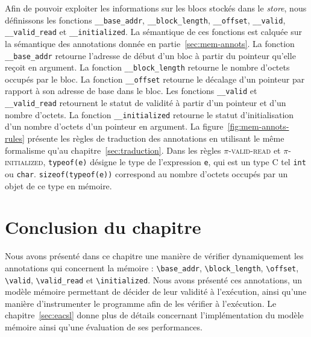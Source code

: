 Afin de pouvoir exploiter les informations sur les blocs stockés dans le
\textit{store}, nous définissons les fonctions \lstinline'__base_addr',
\lstinline'__block_length', \lstinline'__offset', \lstinline'__valid',
\lstinline'__valid_read' et \lstinline'__initialized'.
La sémantique de ces fonctions est calquée sur la sémantique des annotations
\eacsl donnée en partie~\ref{sec:mem-annots}.
La fonction \lstinline'__base_addr' retourne l'adresse de début d'un bloc à
partir du pointeur qu'elle reçoit en argument.
La fonction \lstinline'__block_length' retourne le nombre d'octets occupés par
le bloc.
La fonction \lstinline'__offset' retourne le décalage d'un pointeur par rapport
à son adresse de base dans le bloc.
Les fonctions \lstinline'__valid' et \lstinline'__valid_read'
retournent le statut de validité à partir d'un pointeur et d'un nombre d'octets.
La fonction \lstinline'__initialized' retourne le statut d'initialisation
d'un nombre d'octets d'un pointeur en argument.
La figure~\ref{fig:mem-annots-rules} présente les règles de traduction des
annotations en utilisant le même formalisme qu'au chapitre~\ref{sec:traduction}.
Dans les règles \textsc{$\pi$-valid-read} et \textsc{$\pi$-initialized},
\lstinline'typeof(e)' désigne le type de l'expression \lstinline'e', qui est un
type C tel \lstinline'int' ou \lstinline'char'.
\lstinline'sizeof(typeof(e))' correspond au nombre d'octets occupés par un objet
de ce type en mémoire.


\section*{Conclusion du chapitre}


Nous avons présenté dans ce chapitre une manière de vérifier dynamiquement les
annotations \eacsl qui concernent la mémoire : \lstinline'\base_addr',
\lstinline'\block_length', \lstinline'\offset', \lstinline'\valid',
\lstinline'\valid_read' et \lstinline'\initialized'.
Nous avons présenté ces annotations, un modèle mémoire permettant de décider de
leur validité à l'exécution, ainsi qu'une manière d'instrumenter le programme
afin de les vérifier à l'exécution.
Le chapitre~\ref{sec:eacsl} donne plus de détails concernant l'implémentation
du modèle mémoire ainsi qu'une évaluation de ses performances.
